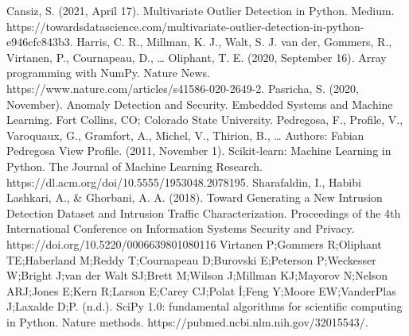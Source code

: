 \documentclass[conference]{IEEEtran}
\begin{document}

%

\begin{thebibliography}{00}
 Cansiz, S. (2021, April 17). Multivariate Outlier Detection in Python. Medium. https://towardsdatascience.com/multivariate-outlier-detection-in-python-e946cfc843b3. 
 Harris, C. R., Millman, K. J., Walt, S. J. van der, Gommers, R., Virtanen, P., Cournapeau, D., … Oliphant, T. E. (2020, September 16). Array programming with NumPy. Nature News. https://www.nature.com/articles/s41586-020-2649-2. 
 Pasricha, S. (2020, November). Anomaly Detection and Security. Embedded Systems and Machine Learning. Fort Collins, CO; Colorado State University. 
 Pedregosa, F., Profile, V., Varoquaux, G., Gramfort, A., Michel, V., Thirion, B., … Authors:   Fabian Pedregosa  View Profile. (2011, November 1). Scikit-learn: Machine Learning in Python. The Journal of Machine Learning Research. https://dl.acm.org/doi/10.5555/1953048.2078195. 
Sharafaldin, I., Habibi Lashkari, A., \& Ghorbani, A. A. (2018). Toward Generating a New Intrusion Detection Dataset and Intrusion Traffic Characterization. Proceedings of the 4th International Conference on Information Systems Security and Privacy. https://doi.org/10.5220/0006639801080116 
Virtanen P;Gommers R;Oliphant TE;Haberland M;Reddy T;Cournapeau D;Burovski E;Peterson P;Weckesser W;Bright J;van der Walt SJ;Brett M;Wilson J;Millman KJ;Mayorov N;Nelson ARJ;Jones E;Kern R;Larson E;Carey CJ;Polat İ;Feng Y;Moore EW;VanderPlas J;Laxalde D;P. (n.d.). SciPy 1.0: fundamental algorithms for scientific computing in Python. Nature methods. https://pubmed.ncbi.nlm.nih.gov/32015543/. 
\end{thebibliography}
\end{document}
